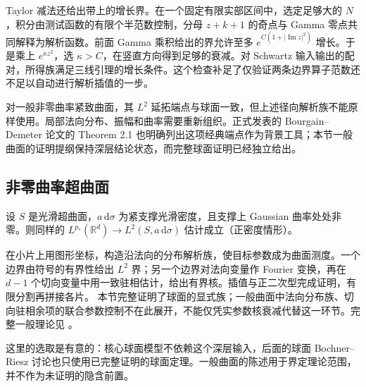 \ProseParagraphBreak

Taylor 减法还给出带上的增长界。在一个固定有限实部区间中，选定足够大的 \(N\)，积分由测试函数的有限个半范数控制，分母 \(z+k+1\) 的奇点与 Gamma 零点共同解释为解析函数。前面 Gamma 乘积给出的界允许至多 \(e^{C(1+|\operatorname{Im}z|^2)}\) 增长。于是乘上 \(e^{\kappa z^2}\)，选 \(\kappa>C\)，在竖直方向得到足够的衰减。对 Schwartz 输入输出的配对，所得族满足三线引理的增长条件。这个检查补足了仅验证两条边界算子范数还不足以自动进行解析插值的一步。

\ProseParagraphBreak

对一般非零曲率紧致曲面，其 \(L^2\) 延拓端点与球面一致，但上述径向解析族不能原样使用。局部法向分布、振幅和曲率需要重新组织。正式发表的 Bourgain--Demeter 论文\cite{BourgainDemeter2015Proof}的 Theorem 2.1 也明确列出这项经典端点作为背景工具；本节一般曲面的证明提纲保持深层结论状态，而完整球面证明已经独立给出。

\subsection{非零曲率超曲面}
\label{b2:subsec:230404}

\begin{theorem}\label{b2:thm:23-curved-tomas}
设 \(S\) 是光滑超曲面，\(a\,\mathrm d\sigma\) 为紧支撑光滑密度，且支撑上 Gaussian 曲率处处非零。则同样的
\(L^{p_*}(\mathbb R^d)\to L^2(S,a\,\mathrm d\sigma)\) 估计成立（正密度情形）。
\end{theorem}
\begin{proofsketch}
在小片上用图形坐标，构造沿法向的分布解析族，使目标参数成为曲面测度。一个边界由符号的有界性给出 \(L^2\) 界；另一个边界对法向变量作 Fourier 变换，再在 \(d-1\) 个切向变量中用一致驻相估计，给出有界核。插值与正二次型完成证明，有限分割再拼接各片。
本节完整证明了球面的显式族；一般曲面中法向分布族、切向驻相余项的联合参数控制不在此展开，不能仅凭实参数核衰减代替这一环节。完整一般理论见 \cite{Stein1993Harmonic,Sogge2017Fourier}。
\end{proofsketch}
这里的选取是有意的：核心球面模型不依赖这个深层输入，后面的球面 Bochner–Riesz 讨论也只使用已完整证明的球面定理。一般曲面的陈述用于界定理论范围，并不作为未证明的隐含前置。
